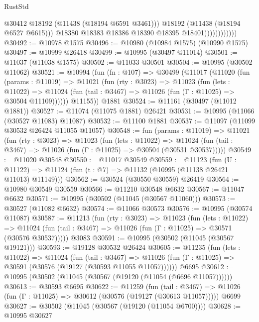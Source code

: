 \begin{lexlean}{RustStd}
\begin{coremodule}
                                @30412
                                @18192
                                (@11438 (@18194 @6591 @3461)))
                              @18192
                              (@11438 (@18194 @6527 @6615)))
                            @18380
                            @18383
                            @18386
                            @18390
                            @18395
                            @18401))))))))))))
@30492 := @10978 @1575
@30496 := @10980 (@10984 @1575) (@10990 @1575)
@30497 := @10999 @26418
@30499 := @10995 (@30497 @11014)
@30501 := @11037 (@11038 @1575)
@30502 := @11033 @30501
@30504 := @10995 (@30502 @11062)
@30521 := @10994
    (fun (fn : @107) =>
    @30499
      (@11017
        (@11020
          (fun (params : @11019) =>
          @11021
            (fun (rty : @3023) =>
            @11023
              (fun (lets : @11022) =>
              @11024 (fun (tail : @3467) => @11026 (fun (Γ : @11025) => @30504 @11109))))))
        @11155))
    @1881
@30524 := @11161 (@30497 (@11012 @1881))
@30527 := @11074 (@11075 @1881) @26421
@30531 := @10995 (@11066 (@30527 @11083) @11087)
@30532 := @11100 @1881
@30537 := @11097 (@11099 @30532 @26424 @11055 @11057)
@30548 := fun (params : @11019) =>
  @11021
    (fun (rty : @3023) =>
    @11023
      (fun (lets : @11022) =>
      @11024 (fun (tail : @3467) => @11026 (fun (Γ : @11025) => @30504 (@30531 @30537)))))
@30549 := @11020 @30548
@30550 := @11017 @30549
@30559 := @11123
    (fun (U : @11122) => @11124 (fun (t : @7) => @11132 (@10995 (@11138 @26421 @11013) @11149)))
@30562 := @30524 (@30550 @30559) @26419
@30564 := @10980 @30549 @30559
@30566 := @11210 @30548 @6632
@30567 := @11047 @6632
@30571 := @10995 (@30502 (@11045 (@30567 @11060)))
@30573 := @30527 (@11082 @6632)
@30574 := @11066 @30573
@30576 := @10995 (@30574 @11087)
@30587 := @11213
    (fun (rty : @3023) =>
    @11023
      (fun (lets : @11022) =>
      @11024 (fun (tail : @3467) => @11026 (fun (Γ : @11025) => @30571 (@30576 @30537)))))
    @3083
@30591 := @10995 (@30502 (@11045 (@30567 @19121)))
@30593 := @19128 @30532 @26424
@30605 := @11235
    (fun (lets : @11022) =>
    @11024
      (fun (tail : @3467) =>
      @11026 (fun (Γ : @11025) => @30591 (@30576 (@19127 (@30593 @11055 @11057))))))
    @6695
@30612 := @10995 (@30502 (@11045 (@30567 (@19120 (@11054 (@6696 @11057))))))
@30613 := @30593 @6695
@30622 := @11259
    (fun (tail : @3467) => @11026 (fun (Γ : @11025) => @30612 (@30576 (@19127 (@30613 @11057)))))
    @6699
@30627 := @30502 (@11045 (@30567 (@19120 (@11054 @6700))))
@30628 := @10995 @30627

\end{coremodule}
\end{lexlean}
